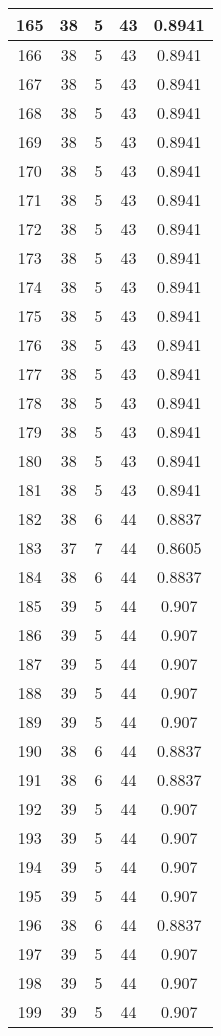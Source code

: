 \documentclass[letterpaper, 12pt]{article}
\begin{document}
\begin{longtable}{|c|c|c|c|c|}
\hline
165 & 38 & 5 & 43 & 0.8941 \\
\hline
166 & 38 & 5 & 43 & 0.8941 \\
\hline
167 & 38 & 5 & 43 & 0.8941 \\
\hline
168 & 38 & 5 & 43 & 0.8941 \\
\hline
169 & 38 & 5 & 43 & 0.8941 \\
\hline
170 & 38 & 5 & 43 & 0.8941 \\
\hline
171 & 38 & 5 & 43 & 0.8941 \\
\hline
172 & 38 & 5 & 43 & 0.8941 \\
\hline
173 & 38 & 5 & 43 & 0.8941 \\
\hline
174 & 38 & 5 & 43 & 0.8941 \\
\hline
175 & 38 & 5 & 43 & 0.8941 \\
\hline
176 & 38 & 5 & 43 & 0.8941 \\
\hline
177 & 38 & 5 & 43 & 0.8941 \\
\hline
178 & 38 & 5 & 43 & 0.8941 \\
\hline
179 & 38 & 5 & 43 & 0.8941 \\
\hline
180 & 38 & 5 & 43 & 0.8941 \\
\hline
181 & 38 & 5 & 43 & 0.8941 \\
\hline
182 & 38 & 6 & 44 & 0.8837 \\
\hline
183 & 37 & 7 & 44 & 0.8605 \\
\hline
184 & 38 & 6 & 44 & 0.8837 \\
\hline
185 & 39 & 5 & 44 & 0.907 \\
\hline
186 & 39 & 5 & 44 & 0.907 \\
\hline
187 & 39 & 5 & 44 & 0.907 \\
\hline
188 & 39 & 5 & 44 & 0.907 \\
\hline
189 & 39 & 5 & 44 & 0.907 \\
\hline
190 & 38 & 6 & 44 & 0.8837 \\
\hline
191 & 38 & 6 & 44 & 0.8837 \\
\hline
192 & 39 & 5 & 44 & 0.907 \\
\hline
193 & 39 & 5 & 44 & 0.907 \\
\hline
194 & 39 & 5 & 44 & 0.907 \\
\hline
195 & 39 & 5 & 44 & 0.907 \\
\hline
196 & 38 & 6 & 44 & 0.8837 \\
\hline
197 & 39 & 5 & 44 & 0.907 \\
\hline
198 & 39 & 5 & 44 & 0.907 \\
\hline
199 & 39 & 5 & 44 & 0.907 \\
\hline
\end{longtable}
\end{document}
